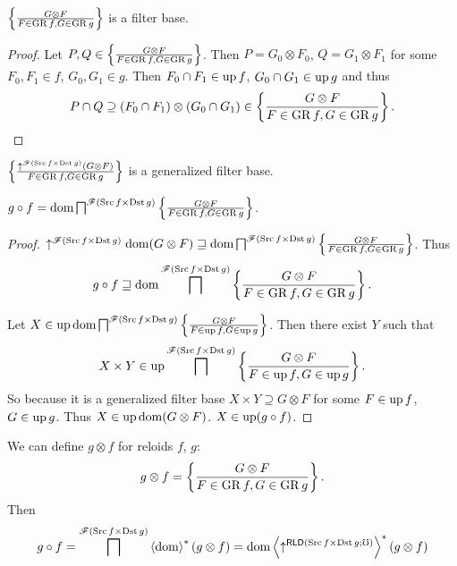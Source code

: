 \begin{lem}
$\setcond{G\otimes F}{F\in\GR f,G\in\GR g}$ is a filter base.\end{lem}
\begin{proof}
Let $P,Q\in\setcond{G\otimes F}{F\in\GR f,G\in\GR g}$. Then $P=G_{0}\otimes F_{0}$,
$Q=G_{1}\otimes F_{1}$ for some $F_{0},F_{1}\in f$, $G_{0},G_{1}\in g$.
Then $F_{0}\cap F_{1}\in\up f$, $G_{0}\cap G_{1}\in\up g$ and thus
\[
P\cap Q\supseteq(F_{0}\cap F_{1})\otimes(G_{0}\cap G_{1})\in\setcond{G\otimes F}{F\in\GR f,G\in\GR g}.
\]
\end{proof}
\begin{cor}
$\setcond{\uparrow^{\mathscr{F}(\Src f\times\Dst g)}(G\otimes F)}{F\in\GR f,G\in\GR g}$
is a generalized filter base.\end{cor}
\begin{prop}
$g\circ f=\dom\bigsqcap^{\mathscr{F}(\Src f\times\Dst g)}\setcond{G\otimes F}{F\in\GR f,G\in\GR g}$.\end{prop}
\begin{proof}
$\uparrow^{\mathscr{F}(\Src f\times\Dst g)}\dom(G\otimes F)\sqsupseteq\dom\bigsqcap^{\mathscr{F}(\Src f\times\Dst g)}\setcond{G\otimes F}{F\in\GR f,G\in\GR g}$.
Thus
\[
g\circ f\sqsupseteq\dom\bigsqcap^{\mathscr{F}(\Src f\times\Dst g)}\setcond{G\otimes F}{F\in\GR f,G\in\GR g}.
\]


Let $X\in\up\dom\bigsqcap^{\mathscr{F}(\Src f\times\Dst g)}\setcond{G\otimes F}{F\in\up f,G\in\up g}$.
Then there exist $Y$ such that
\[
X\times Y\in\up\bigsqcap^{\mathscr{F}(\Src f\times\Dst g)}\setcond{G\otimes F}{F\in\up f,G\in\up g}.
\]
So because it is a generalized filter base $X\times Y\supseteq G\otimes F$
for some $F\in\up f$, $G\in\up g$. Thus $X\in\up\dom(G\otimes F)$.
$X\in\up(g\circ f)$.
\end{proof}
We can define $g\otimes f$ for reloids $f$, $g$:
\[
g\otimes f=\setcond{G\otimes F}{F\in\GR f,G\in\GR g}.
\]
Then
\[
g\circ f=\bigsqcap^{\mathscr{F}(\Src f\times\Dst g)}\rsupfun{\dom}(g\otimes f)=\dom\rsupfun{\uparrow^{\mathsf{RLD}(\Src f\times\Dst g;\mho)}}(g\otimes f)
\]



